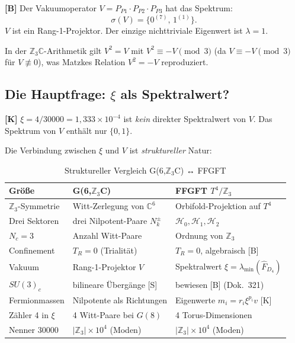 \textbf{[B]} Der Vakuumoperator $V = P_{P1}\cdot P_{P2}\cdot P_{P3}$
hat das Spektrum:
\begin{equation}
  \sigma(V) = \{0^{(7)},\, 1^{(1)}\}.
\end{equation}
$V$ ist ein Rang-1-Projektor. Der einzige nichttriviale Eigenwert ist $\lambda = 1$.

In der $\mathbb{Z}_3\mathbb{C}$-Arithmetik gilt $V^2 = V$ mit
$V^2 \equiv -V \pmod{3}$ (da $V \equiv -V \pmod{3}$ für $V \not\equiv 0$),
was Matzkes Relation $V^2 = -V$ reproduziert.

\subsection{Die Hauptfrage: $\xi$ als Spektralwert?}

\textbf{[K]} $\xi = 4/30000 = 1{,}333\times10^{-4}$ ist \emph{kein}
direkter Spektralwert von $V$. Das Spektrum von $V$ enthält nur $\{0, 1\}$.

Die Verbindung zwischen $\xi$ und $V$ ist \emph{struktureller} Natur:

\begin{table}[h]
\centering
\caption{Struktureller Vergleich G(6,$\mathbb{Z}_3$C) ↔ FFGFT}
\label{tab:vergleich}
\begin{tabular}{lll}
\toprule
Größe & G(6,$\mathbb{Z}_3$C) & FFGFT $T^4/\mathbb{Z}_3$ \\
\midrule
$\mathbb{Z}_3$-Symmetrie & Witt-Zerlegung von $\mathbb{C}^6$ & Orbifold-Projektion auf $T^4$ \\
Drei Sektoren & drei Nilpotent-Paare $N_k^\pm$ & $\mathcal{H}_0, \mathcal{H}_1, \mathcal{H}_2$ \\
$N_c = 3$ & Anzahl Witt-Paare & Ordnung von $\mathbb{Z}_3$ \\
Confinement & $T_R = 0$ (Trialität) & $T_R = 0$, algebraisch [B] \\
Vakuum & Rang-1-Projektor $V$ & Spektralwert $\xi = \lambda_{\min}(\hat{F}_{D_4})$ \\
$SU(3)_c$ & bilineare Übergänge [S] & bewiesen [B] (Dok.~321) \\
Fermionmassen & Nilpotente als Richtungen & Eigenwerte $m_i = r_i\xi^{p_i}v$ [K] \\
Zähler 4 in $\xi$ & 4 Witt-Paare bei $G(8)$ & 4 Torus-Dimensionen \\
Nenner 30000 & $|\mathbb{Z}_3|\times10^4$ (Moden) & $|\mathbb{Z}_3|\times10^4$ (Moden) \\
\bottomrule
\end{tabular}
\end{table}

